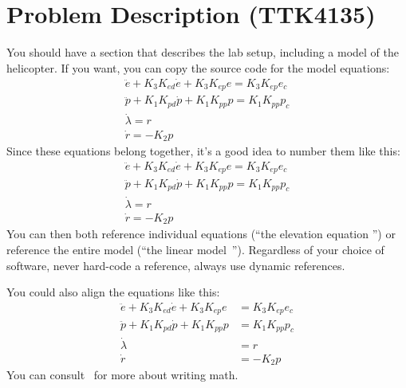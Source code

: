 \section{Problem Description (TTK4135)}\label{sec:prob_descr}
You should have a section that describes the lab setup, including a model of the helicopter. If you want, you can copy the source code for the model equations:
\begin{gather}
	\ddot{e} + K_{3} K_{ed} \dot{e} + K_{3} K_{ep} e = K_{3} K_{ep} e_{c} \label{eq:model_elev} \\
	\ddot{p} + K_{1} K_{pd} \dot{p} + K_{1} K_{pp} p = K_{1} K_{pp} p_{c} \label{eq:model_pitch} \\
	\dot{\lambda} = r \label{eq:model_lambda} \\
	\dot{r} = -K_{2} p \label{eq:model_r} 
\end{gather}
Since these equations belong together, it's a good idea to number them like this:
\begin{subequations}\label{eq:model}
\begin{gather}
	\ddot{e} + K_{3} K_{ed} \dot{e} + K_{3} K_{ep} e = K_{3} K_{ep} e_{c} \label{eq:model_se_elev} \\
	\ddot{p} + K_{1} K_{pd} \dot{p} + K_{1} K_{pp} p = K_{1} K_{pp} p_{c} \label{eq:model_se_pitch} \\
	\dot{\lambda} = r \label{eq:model_se_lambda} \\
	\dot{r} = -K_{2} p \label{eq:model_se_r} 
\end{gather}
\end{subequations}
You can then both reference individual equations (``the elevation equation '') or reference the entire model (``the linear model~''). Regardless of your choice of software, never hard-code a reference, always use dynamic references. 

You could also align the equations like this:
\begin{subequations}\label{eq:model_al}
\begin{align}
	\ddot{e} + K_{3} K_{ed} \dot{e} + K_{3} K_{ep} e &= K_{3} K_{ep} e_{c} \label{eq:model_se_al_elev} \\
	\ddot{p} + K_{1} K_{pd} \dot{p} + K_{1} K_{pp} p &= K_{1} K_{pp} p_{c} \label{eq:model_se_al_pitch} \\
	\dot{\lambda} &= r \label{eq:model_se_al_lambda} \\
	\dot{r} &= -K_{2} p \label{eq:model_se_al_r} 
\end{align}
\end{subequations}
You can consult~\cite{Downes2002} for more about writing math.


